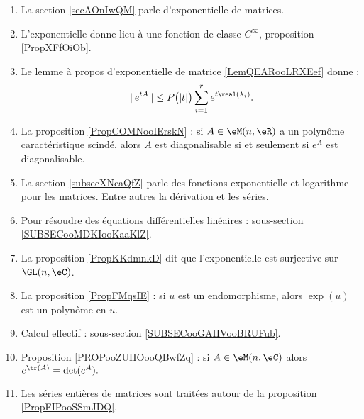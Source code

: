 \begin{description}
\begin{enumerate}
    \item
        La section \ref{secAOnIwQM} parle d'exponentielle de matrices.
    \item
        L'exponentielle donne lieu à une fonction de classe \(  C^{\infty}\), proposition \ref{PropXFfOiOb}.
    \item
            Le lemme à propos d'exponentielle de matrice \ref{LemQEARooLRXEef} donne :
            \begin{equation}
                \|  e^{tA} \|\leq P\big( | t | \big)\sum_{i=1}^r e^{t\real(\lambda_i)}.
            \end{equation}
        \item
            La proposition \ref{PropCOMNooIErskN} : si \( A\in \eM(n,\eR)\) a un polynôme caractéristique scindé, alors \( A\) est diagonalisable si et seulement si \( e^A\) est diagonalisable.
\item
    La section \ref{subsecXNcaQfZ} parle des fonctions exponentielle et logarithme pour les matrices. Entre autres la dérivation et les séries.
\item
    Pour résoudre des équations différentielles linéaires : sous-section \ref{SUBSECooMDKIooKaaKlZ}.
\item
    La proposition \ref{PropKKdmnkD} dit que l'exponentielle est surjective sur \( \GL(n,\eC)\).
\item

La proposition \ref{PropFMqsIE} : si \( u\) est un endomorphisme, alors \( \exp(u)\) est un polynôme en \( u\).
\item
    Calcul effectif : sous-section \ref{SUBSECooGAHVooBRUFub}.
\item Proposition \ref{PROPooZUHOooQBwfZq} : si \( A\in\eM(n,\eC)\) alors $ e^{\tr(A)}=\det( e^{A}).$
    \item 
        Les séries entières de matrices sont traitées autour de la proposition \ref{PropFIPooSSmJDQ}.
\end{enumerate}


\end{description}
